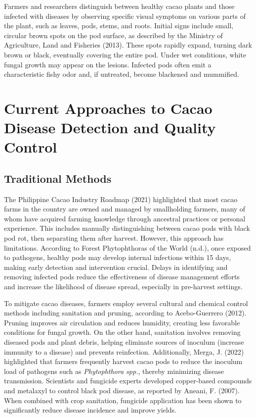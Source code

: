 Farmers and researchers distinguish between healthy cacao plants and those infected with diseases by observing specific visual symptoms on various parts of the plant, such as leaves, pods, stems, and roots. Initial signs include small, circular brown spots on the pod surface, as described by the Ministry of Agriculture, Land and Fisheries (2013). These spots rapidly expand, turning dark brown or black, eventually covering the entire pod. Under wet conditions, white fungal growth may appear on the lesions. Infected pods often emit a characteristic fishy odor and, if untreated, become blackened and mummified.

\section{Current Approaches to Cacao Disease Detection and Quality Control}
\subsection{Traditional Methods}
The Philippine Cacao Industry Roadmap (2021) highlighted that most cacao farms in the country are owned and managed by smallholding farmers, many of whom have acquired farming knowledge through ancestral practices or personal experience. This includes manually distinguishing between cacao pods with black pod rot, then separating them after harvest. However, this approach has limitations. According to Forest Phytophthoras of the World (n.d.), once exposed to pathogens, healthy pods may develop internal infections within 15 days, making early detection and intervention crucial. Delays in identifying and removing infected pods reduce the effectiveness of disease management efforts and increase the likelihood of disease spread, especially in pre-harvest settings.

To mitigate cacao diseases, farmers employ several cultural and chemical control methods including sanitation and pruning, according to Acebo-Guerrero (2012). Pruning improves air circulation and reduces humidity, creating less favorable conditions for fungal growth. On the other hand, sanitation involves removing diseased pods and plant debris, helping eliminate sources of inoculum (increase immunity to a disease) and prevents reinfection. Additionally, Merga, J. (2022) highlighted that farmers frequently harvest cacao pods to reduce the inoculum load of pathogens such as \textit{Phytophthora spp.}, thereby minimizing disease transmission. Scientists and fungicide experts developed copper-based compounds and metalaxyl to control black pod disease, as reported by Aneani, F. (2007). When combined with crop sanitation, fungicide application has been shown to significantly reduce disease incidence and improve yields.

